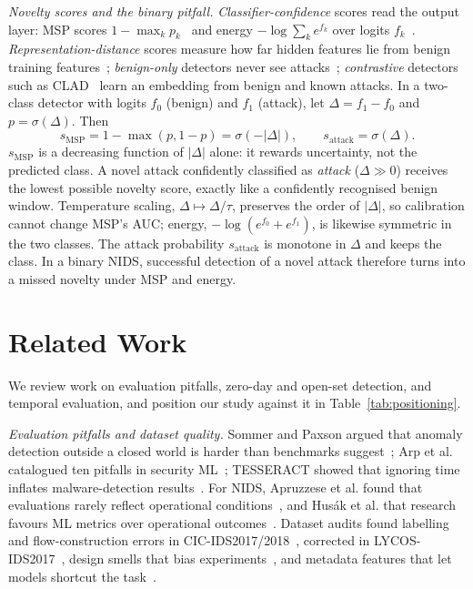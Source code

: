\documentclass[conference]{IEEEtran}
\begin{document}
\emph{Novelty scores and the binary pitfall.} \emph{Classifier-confidence} scores read the output layer: MSP scores $1-\max_k p_k$~\cite{hendrycks2017} and energy $-\log\sum_k e^{f_k}$ over logits $f_k$~\cite{liu2020energy}. \emph{Representation-distance} scores measure how far hidden features lie from benign training features~\cite{lee2018,sun2022knn}; \emph{benign-only} detectors never see attacks~\cite{liu2008if,scholkopf2001}; \emph{contrastive} detectors such as CLAD~\cite{wilkie2026} learn an embedding from benign and known attacks. In a two-class detector with logits $f_0$ (benign) and $f_1$ (attack), let $\Delta=f_1-f_0$ and $p=\sigma(\Delta)$. Then
\begin{equation}
s_{\mathrm{MSP}}=1-\max(p,1-p)=\sigma(-|\Delta|),\qquad s_{\mathrm{attack}}=\sigma(\Delta).
\end{equation}
$s_{\mathrm{MSP}}$ is a decreasing function of $|\Delta|$ alone: it rewards uncertainty, not the predicted class. A novel attack confidently classified as \emph{attack} ($\Delta\gg0$) receives the lowest possible novelty score, exactly like a confidently recognised benign window. Temperature scaling, $\Delta\mapsto\Delta/\tau$, preserves the order of $|\Delta|$, so calibration cannot change MSP's AUC; energy, $-\log(e^{f_0}+e^{f_1})$, is likewise symmetric in the two classes. The attack probability $s_{\mathrm{attack}}$ is monotone in $\Delta$ and keeps the class. In a binary NIDS, successful detection of a novel attack therefore turns into a missed novelty under MSP and energy.

\section{Related Work}\label{sec:related}
We review work on evaluation pitfalls, zero-day and open-set detection, and temporal evaluation, and position our study against it in Table~\ref{tab:positioning}.

\emph{Evaluation pitfalls and dataset quality.} Sommer and Paxson argued that anomaly detection outside a closed world is harder than benchmarks suggest~\cite{sommer2010}; Arp et al. catalogued ten pitfalls in security ML~\cite{arp2022}; TESSERACT showed that ignoring time inflates malware-detection results~\cite{pendlebury2019}. For NIDS, Apruzzese et al. found that evaluations rarely reflect operational conditions~\cite{apruzzese2023}, and Hus\'ak et al. that research favours ML metrics over operational outcomes~\cite{husak2024}. Dataset audits found labelling and flow-construction errors in CIC-IDS2017/2018~\cite{engelen2021,liu2022errors}, corrected in LYCOS-IDS2017~\cite{rosay2021}, design smells that bias experiments~\cite{flood2024}, and metadata features that let models shortcut the task~\cite{dhooge2022}.
\end{document}
